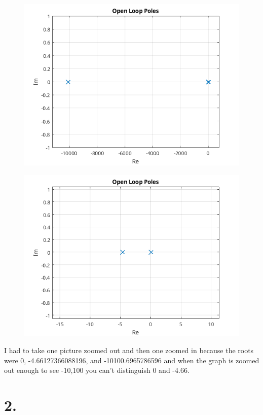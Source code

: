 \documentclass{article}
\begin{document}
\begin{figure}[H]
    \centering
    \includegraphics[width=\textwidth]{openPolesZoomedOut.png}
\end{figure}
\begin{figure}[H]
    \centering
    \includegraphics[width=\textwidth]{openPolesZoomedIn.png}
\end{figure}

I had to take one picture zoomed out and then one zoomed in because the roots were 0, -4.66127366088196, and -10100.6965786596 and when the graph is zoomed out enough to see -10,100 you can't distinguish 0 and -4.66.

\section*{2.}
\end{document}

